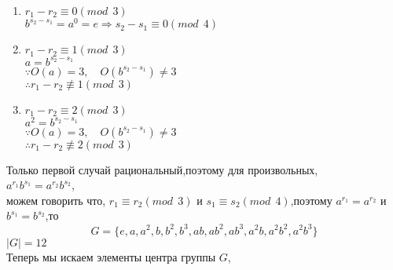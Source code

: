 \documentclass[12pt]{article} %
\theoremstyle{neosn} %
\begin{document}
\begin{enumerate}
	\item $r_1-r_2 \equiv 0(mod \ \  3)$\\
	$b^{s_2-s_1}=a^0=e \Rightarrow s_2-s_1 \equiv 0 (mod \ \ 4)$

	\item $r_1-r_2 \equiv 1(mod \ \  3)$ \\
		$a = b^{s_2-s_1}$ \\
		$\because O(a)=3,\quad O(b^{s_2-s_1}) \neq 3$\\
		$\therefore r_1-r_2 \not\equiv 1(mod \ \ 3)$

	\item $r_1-r_2 \equiv 2(mod \ \  3)$\\
		$a^2=b^{s_2-s_1}$\\
		$\because O(a)=3,\quad O(b^{s_2-s_1}) \neq 3$\\
		$\therefore r_1-r_2 \not\equiv 2 (mod \ \ 3)$
	
\end{enumerate}
Только первой случай рациональный,поэтому для произвольных,\\$a^{r_1}b^{s_1}=a^{r_2}b^{s_2}$,\\можем говорить что,
$r_1 \equiv r_2 (mod \ \ 3)$ и $s_1 \equiv s_2 (mod \ \ 4)$,поэтому $a^{r_1}=a^{r_2}$ и $b^{s_1}=b^{s_2}$,то 
$$
G = \{ e,a,a^2,b,b^2,b^3,ab,ab^2,ab^3,a^2b,a^2b^2,a^2b^3\}
$$
$|G|=12$\\
Теперь мы искаем элементы центра группы $G$,
\end{document}
